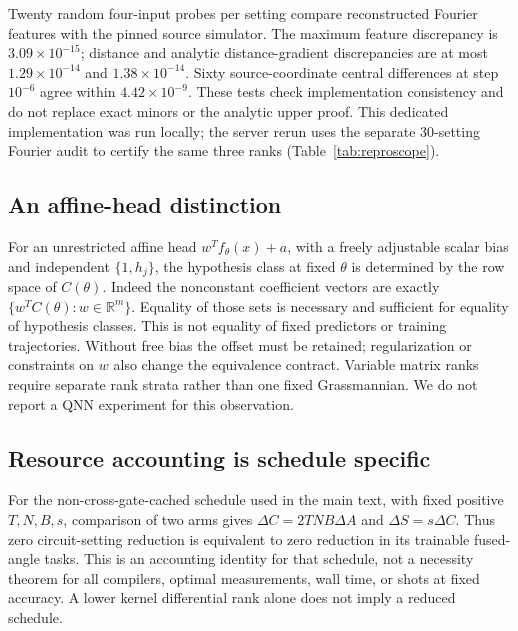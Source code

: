 Twenty random four-input probes per setting compare reconstructed
Fourier features with the pinned source simulator. The maximum
feature discrepancy is $3.09\times10^{-15}$; distance and analytic
distance-gradient discrepancies are at most $1.29\times10^{-14}$ and
$1.38\times10^{-14}$. Sixty source-coordinate central differences
at step $10^{-6}$ agree within $4.42\times10^{-9}$. These tests check
implementation consistency and do not replace exact minors or the
analytic upper proof. This dedicated implementation was run locally;
the server rerun uses the separate 30-setting Fourier audit to certify
the same three ranks (Table~\ref{tab:reproscope}).

\subsection{An affine-head distinction}
For an unrestricted affine head $w^Tf_\theta(x)+a$, with a freely
adjustable scalar bias and independent $\{1,h_j\}$, the hypothesis
class at fixed $\theta$ is determined by the row space of $C(\theta)$.
Indeed the nonconstant coefficient vectors are exactly
$\{w^TC(\theta):w\in\mathbb R^m\}$. Equality of those sets is
necessary and sufficient for equality of hypothesis classes.
This is not equality of fixed predictors or training trajectories.
Without free bias the offset must be retained; regularization or
constraints on $w$ also change the equivalence contract. Variable
matrix ranks require separate rank strata rather than one fixed
Grassmannian. We do not report a QNN experiment for this observation.

\subsection{Resource accounting is schedule specific}
For the non-cross-gate-cached schedule used in the main text, with
fixed positive $T,N,B,s$, comparison of two arms gives
$\Delta C=2TNB\Delta A$ and $\Delta S=s\Delta C$.
Thus zero circuit-setting reduction is equivalent to zero reduction
in its trainable fused-angle tasks. This is an accounting identity
for that schedule, not a necessity theorem for all compilers,
optimal measurements, wall time, or shots at fixed accuracy. A lower
kernel differential rank alone does not imply a reduced schedule.
